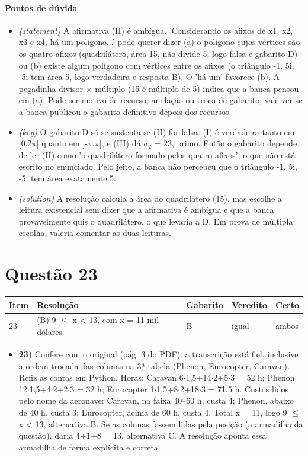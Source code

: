 \documentclass{article}%
\begin{document}
\paragraph{Pontos de dúvida}%
\begin{itemize}%
\item%
\textit{(statement)} A afirmativa (II) é ambígua. 'Considerando os afixos de x1, x2, x3 e x4, há um polígono...' pode querer dizer (a) o polígono cujos vértices são os quatro afixos (quadrilátero, área 15, não divide 5, logo falsa e gabarito D) ou (b) existe algum polígono com vértices entre os afixos (o triângulo -1, 5i, -5i tem área 5, logo verdadeira e resposta B). O 'há um' favorece (b). A pegadinha divisor $\times$ múltiplo (15 é múltiplo de 5) indica que a banca pensou em (a). Pode ser motivo de recurso, anulação ou troca de gabarito; vale ver se a banca publicou o gabarito definitivo depois dos recursos.%
\item%
\textit{(key)} O gabarito D só se sustenta se (II) for falsa. (I) é verdadeira tanto em {[}0,2$\pi${[} quanto em {]}-$\pi$,$\pi${]}, e (III) dá $\sigma$$_{2}$ = 23, primo. Então o gabarito depende de ler (II) como 'o quadrilátero formado pelos quatro afixos', o que não está escrito no enunciado. Pelo jeito, a banca não percebeu que o triângulo -1, 5i, -5i tem área exatamente 5.%
\item%
\textit{(solution)} A resolução calcula a área do quadrilátero (15), mas escolhe a leitura existencial sem dizer que a afirmativa é ambígua e que a banca provavelmente quis o quadrilátero, o que levaria a D. Em prova de múltipla escolha, valeria comentar as duas leituras.%
\end{itemize}%
\section*{Questão 23}%
\begin{longtable}{@{}p{} p{} p{} p{} p{}@{}}\toprule Item & Resolução & Gabarito & Veredito & Certo \\ \midrule
23 & (B) 9 $\leq$ x < 13, com x = 11 mil dólares & B & igual & ambos \\
\bottomrule\end{longtable}%
\begin{itemize}%
\item%
\textbf{23)} Confere com o original (pág. 3 do PDF): a transcrição está fiel, inclusive a ordem trocada das colunas na 3ª tabela (Phenon, Eurocopter, Caravan). Refiz as contas em Python. Horas: Caravan 6$\cdot$1,5+14$\cdot$2+5$\cdot$3 = 52 h; Phenon 12$\cdot$1,5+4$\cdot$2+2$\cdot$3 = 32 h; Eurocopter 1$\cdot$1,5+8$\cdot$2+18$\cdot$3 = 71,5 h. Custos lidos pelo nome da aeronave: Caravan, na faixa 40--60 h, custa 4; Phenon, abaixo de 40 h, custa 3; Eurocopter, acima de 60 h, custa 4. Total x = 11, logo 9 $\leq$ x < 13, alternativa B. Se as colunas fossem lidas pela posição (a armadilha da questão), daria 4+1+8 = 13, alternativa C. A resolução aponta essa armadilha de forma explícita e correta.%
\end{itemize}%
\end{document}
